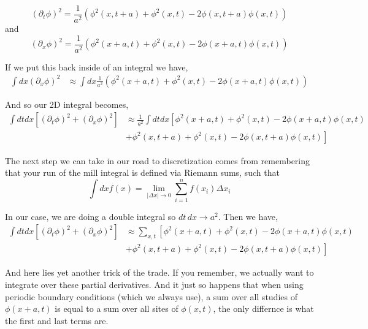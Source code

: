 $$
\left( \partial_t \phi \right)^2 =
\frac{1}{a^2} \left( \phi^2 (x, t+a) + \phi^2 (x, t) - 2\phi(x, t+a) \phi(x, t) \right)
$$
and
$$
\left( \partial_x \phi \right)^2 =
\frac{1}{a^2} \left( \phi^2 (x+a, t) + \phi^2 (x, t) - 2\phi(x+a, t) \phi(x, t) \right)
$$


If we put this back inside of an integral we have,
\begin{align*}
\int dx \left( \partial_x \phi \right)^2 &\approx
    \int dx \frac{1}{a^2} \left( \phi^2 (x+a, t) + \phi^2 (x, t) - 2\phi(x+a, t) \phi(x, t) \right)
\end{align*}

And so our 2D integral becomes,
\begin{equation*}
\begin{split}
\int dt dx \left[ \left( \partial_t \phi \right)^2 + \left( \partial_x \phi \right)^2 \right] &\approx
\frac{1}{a^2} \int dt dx \left[ \phi^2 (x+a, t) + \phi^2 (x, t) - 2\phi(x+a, t) \phi(x, t) \right. \\
& \left. + \phi^2 (x, t+a) + \phi^2 (x, t) - 2\phi(x, t+a) \phi(x, t) \right]
\end{split}
\end{equation*}


The next step we can take in our road to discretization comes from remembering that your run of the mill
integral is defined via Riemann sums, such that
$$
\int dx f(x) = \lim_{|\Delta x| \rightarrow 0} \sum_{i=1}^{n} f(x_i) \Delta x_i
$$

In our case, we are doing a double integral so $dt \, dx \rightarrow a^2$.
Then we have,
\begin{equation*}
\begin{split}
\int dt dx \left[ \left( \partial_t \phi \right)^2 + \left( \partial_x \phi \right)^2 \right] &\approx
\sum_{x,t} \left[ \phi^2 (x+a, t) + \phi^2 (x, t) - 2\phi(x+a, t) \phi(x, t) \right. \\
    & \left. + \phi^2 (x, t+a) + \phi^2 (x, t) - 2\phi(x, t+a) \phi(x, t) \right]
\end{split}
\end{equation*}


And here lies yet another trick of the trade.
If you remember, we actually want to integrate over these partial derivatives.
And it just so happens that when using periodic boundary conditions (which we always use), a sum over all studies
of $\phi(x+a, t)$ is equal to a sum over all sites of $\phi(x, t)$, the only differnce is what the first and last terms are.

